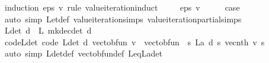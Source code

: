 \begin{isabellebody}
%
\isadelimproof
%
\endisadelimproof
%
\isatagproof
{}\isamarkupfalse%
\ {\isacharparenleft}{\kern0pt}induction\ eps\ v\ rule{\isacharcolon}{\kern0pt}\ value{\isacharunderscore}{\kern0pt}iteration{\isachardot}{\kern0pt}induct{\isacharparenright}{\kern0pt}\isanewline
\ \ \isamarkupfalse%
\ {\isacharparenleft}{\kern0pt}{}\ eps\ v{\isacharparenright}{\kern0pt}\isanewline
\ \ \isamarkupfalse%
\ \isamarkupfalse%
\ {\isacharquery}{\kern0pt}case\isanewline
\ \ \ \ \isamarkupfalse%
\ {\isacharparenleft}{\kern0pt}auto\ simp{\isacharcolon}{\kern0pt}\ Let{\isacharunderscore}{\kern0pt}def\ value{\isacharunderscore}{\kern0pt}iteration{\isachardot}{\kern0pt}simps\ value{\isacharunderscore}{\kern0pt}iteration{\isacharunderscore}{\kern0pt}partial{\isachardot}{\kern0pt}simps{\isacharparenright}{\kern0pt}\isanewline
{}\isamarkupfalse%
%
\endisatagproof
{\isafoldproof}%
%
\isadelimproof
\isanewline
%
\endisadelimproof
\isanewline
{}\isamarkupfalse%
\ {\isachardoublequoteopen}L{\isacharunderscore}{\kern0pt}det\ d\ {\isacharequal}{\kern0pt}\ L\ {\isacharparenleft}{\kern0pt}mk{\isacharunderscore}{\kern0pt}dec{\isacharunderscore}{\kern0pt}det\ d{\isacharparenright}{\kern0pt}{\isachardoublequoteclose}\ \isanewline
\isanewline
{}\isamarkupfalse%
\ code{\isacharunderscore}{\kern0pt}L{\isacharunderscore}{\kern0pt}det\ {\isacharbrackleft}{\kern0pt}code{\isacharbrackright}{\kern0pt}{\isacharcolon}{\kern0pt}\ {\isachardoublequoteopen}L{\isacharunderscore}{\kern0pt}det\ d\ {\isacharparenleft}{\kern0pt}vec{\isacharunderscore}{\kern0pt}to{\isacharunderscore}{\kern0pt}bfun\ v{\isacharparenright}{\kern0pt}\ {\isacharequal}{\kern0pt}\ vec{\isacharunderscore}{\kern0pt}to{\isacharunderscore}{\kern0pt}bfun\ {\isacharparenleft}{\kern0pt}{\isasymchi}\ s{\isachardot}{\kern0pt}\ L\isactrlsub a\ {\isacharparenleft}{\kern0pt}d\ s{\isacharparenright}{\kern0pt}\ {\isacharparenleft}{\kern0pt}vec{\isacharunderscore}{\kern0pt}nth\ v{\isacharparenright}{\kern0pt}\ s{\isacharparenright}{\kern0pt}{\isachardoublequoteclose}\isanewline
%
\isadelimproof
\ \ %
\endisadelimproof
%
\isatagproof
{}\isamarkupfalse%
\ {\isacharparenleft}{\kern0pt}auto\ simp{\isacharcolon}{\kern0pt}\ L{\isacharunderscore}{\kern0pt}det{\isacharunderscore}{\kern0pt}def\ vec{\isacharunderscore}{\kern0pt}to{\isacharunderscore}{\kern0pt}bfun{\isacharunderscore}{\kern0pt}def\ L{\isacharunderscore}{\kern0pt}eq{\isacharunderscore}{\kern0pt}L\isactrlsub a{\isacharunderscore}{\kern0pt}det{\isacharparenright}{\kern0pt}%

\end{isabellebody}
